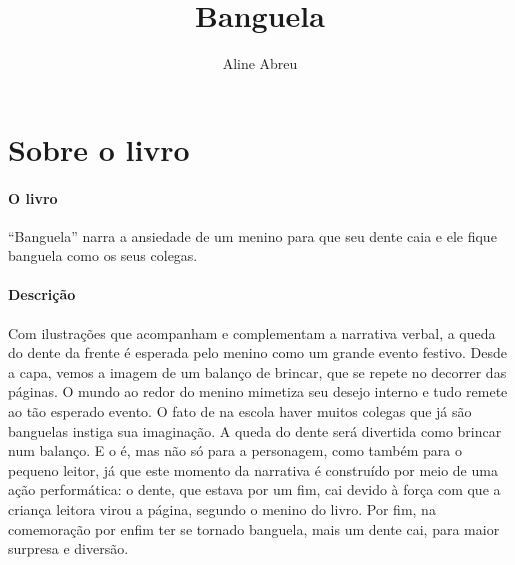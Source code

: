 \documentclass[11pt]{extarticle}
\newcommand{\AutorLivro}{Aline Abreu}
\newcommand{\TituloLivro}{Banguela}
\newcommand{\colaborador}{{Paulo Pompermaier e Renier Silva}}
\begin{document}
\title{\TituloLivro}
\author{\AutorLivro}
\def\authornotes{\colaborador}

\date{}
\maketitle


\tableofcontents



\section{Sobre o livro}

\paragraph{O livro} 
``Banguela'' narra a ansiedade de um menino para que seu dente caia e ele fique banguela como os seus colegas.

\paragraph{Descrição} 
Com ilustrações que acompanham e complementam a narrativa verbal, a queda do dente
da frente é esperada pelo menino como um grande evento festivo. Desde a capa, vemos a imagem
de um balanço de brincar, que se repete no decorrer das páginas. O mundo ao redor do menino
mimetiza seu desejo interno e tudo remete ao tão esperado evento. 
O fato de na escola haver muitos colegas que já são banguelas instiga sua imaginação.
A queda do dente será divertida como brincar num balanço. E o é, mas não só para a personagem,
como também para o pequeno leitor, já que este momento da narrativa é construído por meio 
de uma ação performática: o dente, que estava por um fim, cai devido à força com que a
criança leitora virou a página, segundo o menino do livro. Por fim, na comemoração por enfim
ter se tornado banguela, mais um dente cai, para maior surpresa e diversão. 

\end{document}
